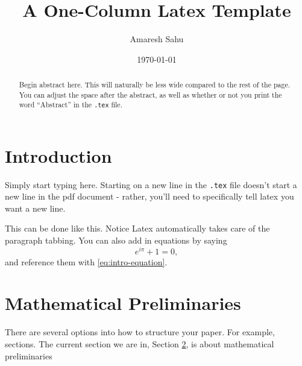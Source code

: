 \documentclass[10pt,notitlepage]{article}
\title{\bfseries{\Large{\sffamily A One-Column Latex Template}}}
\author{\large{\sffamily Amaresh Sahu}}
\date{\normalsize \sffamily \today}
\begin{document}
\thispagestyle{empty}



%
%

\maketitle



%
%

\renewcommand{\abstractname}{}
\begin{abstract} \sffamily
	Begin abstract here.
	This will naturally be less wide compared to the rest of the page.
	You can adjust the space after the abstract, as well as whether or not you print the word ``Abstract'' in the \verb+.tex+ file.
	\vspace{20pt}
\end{abstract}



%
%

\section{Introduction}

Simply start typing here.
Starting on a new line in the \verb+.tex+ file doesn't start a new line in the pdf document - rather, you'll need to specifically tell latex you want a new line.
\bigskip

This can be done like this.
Notice Latex automatically takes care of the paragraph tabbing.
You can also add in equations by saying
\begin{equation} \label{eq:intro-equation}
	e^{i\pi} + 1 = 0,
\end{equation}
and reference them with \eqref{eq:intro-equation}.



%
%

\section{Mathematical Preliminaries} \label{sec:math-prelims}

There are several options into how to structure your paper.
For example, sections.
The current section we are in, Section \ref{sec:math-prelims}, is about mathematical preliminaries



%
%
\end{document}
